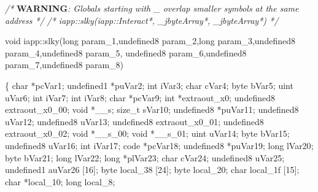 \documentclass[
]{article}
\newenvironment{Shaded}{}{}
\newcommand{\AlertTok}[1]{\textcolor[rgb]{1.00,0.00,0.00}{\textbf{#1}}}
\newcommand{\CommentTok}[1]{\textcolor[rgb]{0.38,0.63,0.69}{\textit{#1}}}
\newcommand{\DataTypeTok}[1]{\textcolor[rgb]{0.56,0.13,0.00}{#1}}
\newcommand{\DecValTok}[1]{\textcolor[rgb]{0.25,0.63,0.44}{#1}}
\newcommand{\ExtensionTok}[1]{#1}
\newcommand{\NormalTok}[1]{#1}
\newcommand{\OperatorTok}[1]{\textcolor[rgb]{0.40,0.40,0.40}{#1}}
\begin{document}
\begin{Shaded}
\begin{Highlighting}[]
\CommentTok{/* }\AlertTok{WARNING}\CommentTok{: Globals starting with \textquotesingle{}\_\textquotesingle{} overlap smaller symbols at the same address */}
\CommentTok{/* iapp::slky(iapp::Interact*, \_jbyteArray*, \_jbyteArray*) */}

\DataTypeTok{void}\NormalTok{ iapp}\OperatorTok{::}\NormalTok{slky}\OperatorTok{(}\DataTypeTok{long}\NormalTok{ param\_1}\OperatorTok{,}\NormalTok{undefined8 param\_2}\OperatorTok{,}\DataTypeTok{long}\NormalTok{ param\_3}\OperatorTok{,}\NormalTok{undefined8 param\_4}\OperatorTok{,}\NormalTok{undefined8 param\_5}\OperatorTok{,}
\NormalTok{               undefined8 param\_6}\OperatorTok{,}\NormalTok{undefined8 param\_7}\OperatorTok{,}\NormalTok{undefined8 param\_8}\OperatorTok{)}

\OperatorTok{\{}
  \DataTypeTok{char} \OperatorTok{*}\NormalTok{pcVar1}\OperatorTok{;}
\NormalTok{  undefined1 }\OperatorTok{*}\NormalTok{puVar2}\OperatorTok{;}
  \DataTypeTok{int}\NormalTok{ iVar3}\OperatorTok{;}
  \DataTypeTok{char}\NormalTok{ cVar4}\OperatorTok{;}
\NormalTok{  byte bVar5}\OperatorTok{;}
  \ExtensionTok{uint}\NormalTok{ uVar6}\OperatorTok{;}
  \DataTypeTok{int}\NormalTok{ iVar7}\OperatorTok{;}
  \DataTypeTok{int}\NormalTok{ iVar8}\OperatorTok{;}
  \DataTypeTok{char} \OperatorTok{*}\NormalTok{pcVar9}\OperatorTok{;}
  \DataTypeTok{int} \OperatorTok{*}\NormalTok{extraout\_x0}\OperatorTok{;}
\NormalTok{  undefined8 extraout\_x0\_00}\OperatorTok{;}
  \DataTypeTok{void} \OperatorTok{*}\NormalTok{\_\_s}\OperatorTok{;}
  \DataTypeTok{size\_t}\NormalTok{ sVar10}\OperatorTok{;}
\NormalTok{  undefined8 }\OperatorTok{*}\NormalTok{puVar11}\OperatorTok{;}
\NormalTok{  undefined8 uVar12}\OperatorTok{;}
\NormalTok{  undefined8 uVar13}\OperatorTok{;}
\NormalTok{  undefined8 extraout\_x0\_01}\OperatorTok{;}
\NormalTok{  undefined8 extraout\_x0\_02}\OperatorTok{;}
  \DataTypeTok{void} \OperatorTok{*}\NormalTok{\_\_s\_00}\OperatorTok{;}
  \DataTypeTok{void} \OperatorTok{*}\NormalTok{\_\_s\_01}\OperatorTok{;}
  \ExtensionTok{uint}\NormalTok{ uVar14}\OperatorTok{;}
\NormalTok{  byte bVar15}\OperatorTok{;}
\NormalTok{  undefined8 uVar16}\OperatorTok{;}
  \DataTypeTok{int}\NormalTok{ iVar17}\OperatorTok{;}
\NormalTok{  code }\OperatorTok{*}\NormalTok{pcVar18}\OperatorTok{;}
\NormalTok{  undefined8 }\OperatorTok{*}\NormalTok{puVar19}\OperatorTok{;}
  \DataTypeTok{long}\NormalTok{ lVar20}\OperatorTok{;}
\NormalTok{  byte bVar21}\OperatorTok{;}
  \DataTypeTok{long}\NormalTok{ lVar22}\OperatorTok{;}
  \DataTypeTok{long} \OperatorTok{*}\NormalTok{plVar23}\OperatorTok{;}
  \DataTypeTok{char}\NormalTok{ cVar24}\OperatorTok{;}
\NormalTok{  undefined8 uVar25}\OperatorTok{;}
\NormalTok{  undefined1 auVar26 }\OperatorTok{[}\DecValTok{16}\OperatorTok{];}
\NormalTok{  byte local\_38 }\OperatorTok{[}\DecValTok{24}\OperatorTok{];}
\NormalTok{  byte local\_20}\OperatorTok{;}
  \DataTypeTok{char}\NormalTok{ local\_1f }\OperatorTok{[}\DecValTok{15}\OperatorTok{];}
  \DataTypeTok{char} \OperatorTok{*}\NormalTok{local\_10}\OperatorTok{;}
  \DataTypeTok{long}\NormalTok{ local\_8}\OperatorTok{;}
  

\end{Highlighting}
\end{Shaded}
\end{document}
